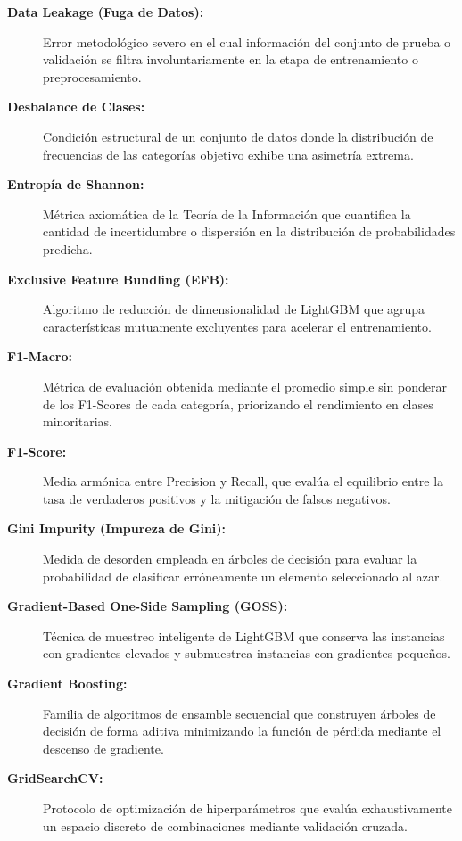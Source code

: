 \begin{description}
    \item[\textbf{Data Leakage (Fuga de Datos):}] Error metodológico severo en el cual información del conjunto de prueba o validación se filtra involuntariamente en la etapa de entrenamiento o preprocesamiento.

    \item[\textbf{Desbalance de Clases:}] Condición estructural de un conjunto de datos donde la distribución de frecuencias de las categorías objetivo exhibe una asimetría extrema.

    \item[\textbf{Entropía de Shannon:}] Métrica axiomática de la Teoría de la Información que cuantifica la cantidad de incertidumbre o dispersión en la distribución de probabilidades predicha.

    \item[\textbf{Exclusive Feature Bundling (EFB):}] Algoritmo de reducción de dimensionalidad de LightGBM que agrupa características mutuamente excluyentes para acelerar el entrenamiento.

    \item[\textbf{F1-Macro:}] Métrica de evaluación obtenida mediante el promedio simple sin ponderar de los F1-Scores de cada categoría, priorizando el rendimiento en clases minoritarias.

    \item[\textbf{F1-Score:}] Media armónica entre Precision y Recall, que evalúa el equilibrio entre la tasa de verdaderos positivos y la mitigación de falsos negativos.

    \item[\textbf{Gini Impurity (Impureza de Gini):}] Medida de desorden empleada en árboles de decisión para evaluar la probabilidad de clasificar erróneamente un elemento seleccionado al azar.

    \item[\textbf{Gradient-Based One-Side Sampling (GOSS):}] Técnica de muestreo inteligente de LightGBM que conserva las instancias con gradientes elevados y submuestrea instancias con gradientes pequeños.

    \item[\textbf{Gradient Boosting:}] Familia de algoritmos de ensamble secuencial que construyen árboles de decisión de forma aditiva minimizando la función de pérdida mediante el descenso de gradiente.

    \item[\textbf{GridSearchCV:}] Protocolo de optimización de hiperparámetros que evalúa exhaustivamente un espacio discreto de combinaciones mediante validación cruzada.


\end{description}
